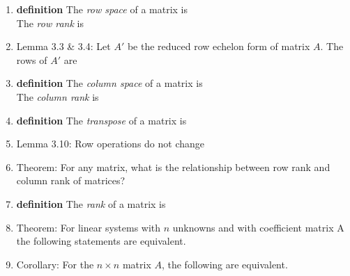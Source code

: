 \documentclass[11pt,fleqn]{article}
\begin{document}
\renewcommand{\headrulewidth}{0pt}
\newcommand{\blank}[1]{\rule{#1}{0.75pt}}
\renewcommand{\d}{\displaystyle}

\vspace*{-0.7in}

\begin{center}
  \large {}
\end{center}
\begin{enumerate}
\item \textbf{definition}  The \emph{row space} of a matrix is \\

The \emph{row rank} is \\

\item Lemma 3.3 \& 3.4: Let $A'$ be the reduced row echelon form of matrix $A$. The rows of $A'$ are\\

\vfill

\item \textbf{definition}  The \emph{column space} of a matrix is \\

The \emph{column rank} is \\

\item \textbf{definition}  The \emph{transpose} of a matrix is \\

\item Lemma 3.10: Row operations do not change \\

\item Theorem: For any matrix, what is the relationship between row rank and column rank of matrices?\\

\item \textbf{definition}  The \emph{rank} of a matrix is \\

\item Theorem: For linear systems with $n$ unknowns and with coefficient matrix A the following statements are equivalent.
\vspace{1in}
\item Corollary: For the $n \times n$ matrix $A$, the following are equivalent.
\vspace{2in}
\end{enumerate}
\end{document}
